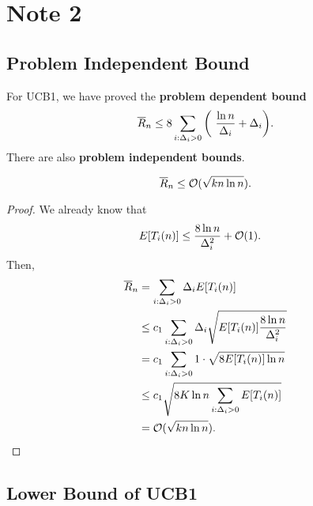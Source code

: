 \newpage
\section{Note 2}

\subsection{Problem Independent Bound} %

For UCB1, we have proved the \textbf{problem dependent bound}
\begin{equation}
    {\overline{R}}_n\le 8 \sum_{i:\Delta_i>0} \bigg(~\frac{\ln n}{\Delta_i}+\Delta_i\bigg).
\end{equation}
There are also \textbf{problem independent bounds}.

\begin{thm}
    \begin{equation}
        {\overline{R}}_n\le\mathcal{O}(\sqrt{kn\ln n}).
    \end{equation}
\end{thm}
\begin{proof}
    We already know that
    \begin{align}
        E[T_i(n)]
            &\le \frac{8\ln n}{\Delta_i^2} + \mathcal{O}(1).
    \end{align}
    Then,
    \begin{align}
        {\overline{R}}_n
            &= \sum_{i:\Delta_i>0} \Delta_i E[T_i(n)] \\
            &\le c_1 \sum_{i:\Delta_i>0} \Delta_i \sqrt{E[T_i(n)] \frac{8\ln n}{\Delta_i^2}} \\
            &= c_1 \sum_{i:\Delta_i>0} 1\cdot \sqrt{8 E[T_i(n)] \ln n} \\
            &\le c_1 \sqrt{8 K \ln n \sum_{i:\Delta_i>0} E[T_i(n)] } \\
            &= \mathcal{O}(\sqrt{kn\ln n}).
    \end{align}

\end{proof}

\subsection{Lower Bound of UCB1} %

